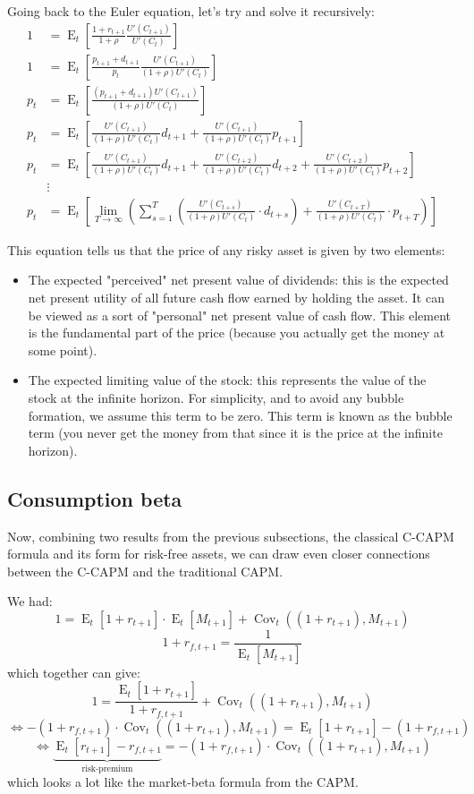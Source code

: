 \documentclass[12pt]{report}
\newcommand{\Et}[1]{\operatorname{E}_t\left[#1\right]}
\newcommand{\covt}[1]{\operatorname{Cov}_t\left(#1\right)}
\begin{document}
Going back to the Euler equation, let's try and solve it recursively:
\begin{align*}
1 & = \Et{\frac{1+r_{t+1}}{1+\rho} \frac{U'(C_{t+1})}{U'(C_t)}}   \\ 
1 & = \Et{\frac{ p_{t+1} + d_{t+1}}{p_{t}} \frac{U'(C_{t+1})}{(1+\rho)U'(C_t)}}  \\
p_{t} & =\Et{\frac{(p_{t+1} + d_{t+1})U'(C_{t+1})}{(1+\rho)U'(C_t)}}\\ 
p_{t} & =\Et{\frac{U'(C_{t+1})}{(1+\rho)U'(C_t)}d_{t+1} + \frac{U'(C_{t+1})}{(1+\rho)U'(C_t)}p_{t+1} } \\
p_{t} & =\Et{\frac{U'(C_{t+1})}{(1+\rho)U'(C_t)}d_{t+1} + \frac{U'(C_{t+2})}{(1+\rho)U'(C_t)}d_{t+2} + \frac{U'(C_{t+2})}{(1+\rho)U'(C_t)}p_{t+2} }\\
& \vdots \\
p_{t} & = \Et{\lim_{T\to\infty}\left( \sum_{s=1}^{T} \left(\frac{U'(C_{t+s})}{(1+\rho)U'(C_t)}\cdot d_{t+s}\right) + \frac{U'(C_{t+T})}{(1+\rho)U'(C_t)}\cdot p_{t+T}\right) } 
\end{align*}

This equation tells us that the price of any risky asset is given by two elements: \begin{itemize}
\item The expected "perceived" net present value of dividends: this is the expected net present utility of all future cash flow earned by holding the asset. It can be viewed as a sort of "personal" net present value of cash flow. This element is the fundamental part of the price (because you actually get the money at some point).
\item The expected limiting value of the stock: this represents the value of the stock at the infinite horizon. For simplicity, and to avoid any bubble formation, we assume this term to be zero. This term is known as the bubble term (you never get the money from that since it is the price at the infinite horizon).
\end{itemize}

\subsection{Consumption beta}

Now, combining two results from the previous subsections, the classical C-CAPM formula and its form for risk-free assets, we can draw even closer connections between the C-CAPM and the traditional CAPM.

We had: $$ 1 = \Et{1+r_{t+1}}\cdot\Et{M_{t+1}} + \covt{(1+r_{t+1}), M_{t+1}}$$ $$ 1+r_{f, t+1} =\frac{1}{\Et{M_{t+1}}} $$ which together can give: $$1 = \frac{\Et{1+r_{t+1}}}{1+r_{f, t+1}} + \covt{(1+r_{t+1}), M_{t+1}} $$ $$\Leftrightarrow -(1+r_{f, t+1})\cdot\covt{(1+r_{t+1}), M_{t+1}} = \Et{1+r_{t+1}} - (1+r_{f, t+1}) $$ $$\Leftrightarrow \underbrace{\Et{r_{t+1}} - r_{f, t+1}}_{\text{risk-premium}} = -(1+r_{f, t+1})\cdot\covt{(1+r_{t+1}), M_{t+1}} $$ which looks a lot like the market-beta formula from the CAPM.
\end{document}

